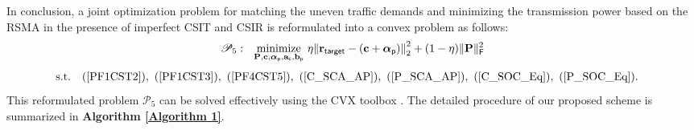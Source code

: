 \documentclass[draftclsnofoot, onecolumn, comsoc, 12pt]{IEEEtran}
\DeclareMathOperator*{\minimize}{minimize}
\begin{document}
In conclusion, a joint optimization problem for matching the uneven traffic demands and minimizing the transmission power based on the RSMA in the presence of imperfect CSIT and CSIR is reformulated into a convex problem as follows:
\begin{align}
\nonumber
\mathscr{P}_5: \,\,\,\, 
\minimize_{\mathbf{P}, \mathbf{c}, \boldsymbol{\alpha}_{{\sf{p}}}, \mathbf{a}_{\sf{c}}, \mathbf{b}_{{\sf{p}}}} \,
\eta{\Vert {\mathbf{r}_{\sf target}- (\mathbf{c} + \boldsymbol{\alpha}_{\sf{p}})} \Vert}_{2}^{2} + (1-\eta) \Vert {\mathbf{P}} \Vert_{\sf{F}}^{2}
\end{align}\setcounter{equation}{31}%
\begin{subequations}\label{condition}
\begin{align}
\mathrm{s.t.}\,\,\,\,\,\,
& \textrm{(\ref{PF1CST2})}, \,\,  \textrm{(\ref{PF1CST3})}, \,\, \textrm{(\ref{PF4CST5})}, \,\, \textrm{(\ref{C_SCA_AP})}, \,\, \textrm{(\ref{P_SCA_AP})}, \,\, \textrm{(\ref{C_SOC_Eq})}, \,\, \textrm{(\ref{P_SOC_Eq})}. \nonumber
\end{align}
\end{subequations}
This reformulated problem $\mathscr{P}_5$ can be solved effectively using the CVX toolbox \cite{grant2014cvx}. The detailed procedure of our proposed scheme is summarized in \textbf{Algorithm \ref{Algorithm 1}}.
\end{document}
